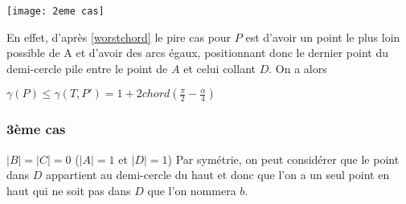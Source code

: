 \texttt{[image: 2eme cas]}

En effet, d'après \ref{worstchord} le pire cas pour $P$ est d'avoir un point le plus loin possible de A et d'avoir des arcs égaux, positionnant donc le dernier point du demi-cercle pile entre le point de $A$ et celui collant $D$. On a alors

$\gamma(P) \leq \gamma(T, P') = 1 + 2chord(\frac{\pi}{2} - \frac{\alpha}{4})$

\subsubsection*{3ème cas} $|B| = |C| = 0$ ($|A| = 1$ et $|D| = 1$)
Par symétrie, on peut considérer que le point dans $D$ appartient au demi-cercle du haut et donc que l'on a un seul point en haut qui ne soit pas dans $D$ que l'on nommera $b$.

